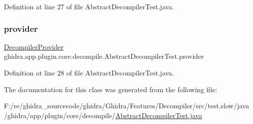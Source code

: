 Definition at line 27 of file Abstract\+Decompiler\+Test.\+java.

\mbox{\label{classghidra_1_1app_1_1plugin_1_1core_1_1decompile_1_1_abstract_decompiler_test_a5958a6cf8e136e45b59b1e6df0914d80}} 
\subsubsection{\texorpdfstring{provider}{provider}}
{\footnotesize\ttfamily \mbox{\hyperlink{classghidra_1_1app_1_1plugin_1_1core_1_1decompile_1_1_decompiler_provider}{Decompiler\+Provider}} ghidra.\+app.\+plugin.\+core.\+decompile.\+Abstract\+Decompiler\+Test.\+provider\hspace{0.3cm}{\ttfamily [protected]}}



Definition at line 28 of file Abstract\+Decompiler\+Test.\+java.



The documentation for this class was generated from the following file\+:\begin{DoxyCompactItemize}
\item 
F\+:/re/ghidra\+\_\+sourcecode/ghidra/\+Ghidra/\+Features/\+Decompiler/src/test.\+slow/java/ghidra/app/plugin/core/decompile/\mbox{\hyperlink{_abstract_decompiler_test_8java}{Abstract\+Decompiler\+Test.\+java}}\end{DoxyCompactItemize}
